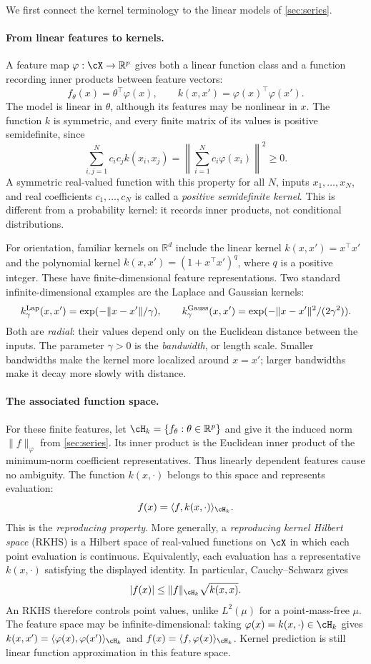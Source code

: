 \documentclass[11pt,twoside]{article}
\newcommand{\R}{\mathbb R}
\theoremstyle{definition}
\theoremstyle{remark}
\begin{document}
We first connect the kernel terminology to the linear models of
\cref{sec:series}.

\paragraph{From linear features to kernels.}
A feature map $\varphi:\cX\to\R^p$ gives both a linear function class and
a function recording inner products between feature vectors:
\[
 f_\theta(x)=\theta^\top\varphi(x),\qquad
 k(x,x')=\varphi(x)^\top\varphi(x').
\]
The model is linear in $\theta$, although its features may be nonlinear in
$x$. The function $k$ is symmetric, and every finite matrix of its values is
positive semidefinite, since
\[
 \sum_{i,j=1}^N c_ic_jk(x_i,x_j)
 =\left\|\sum_{i=1}^N c_i\varphi(x_i)\right\|^2\ge0.
\]
A symmetric real-valued function with this property for all $N$, inputs
$x_1,\ldots,x_N$, and real coefficients $c_1,\ldots,c_N$ is called a
\emph{positive semidefinite kernel}. This is different from a probability
kernel: it records inner products, not conditional distributions.

For orientation, familiar kernels on $\R^d$ include the linear kernel
$k(x,x')=x^\top x'$ and the polynomial kernel
$k(x,x')=(1+x^\top x')^q$, where $q$ is a positive integer. These have
finite-dimensional feature representations. Two standard
infinite-dimensional examples are the Laplace and Gaussian kernels:
\[
 k^{\rm Lap}_\gamma(x,x')=\exp(-\|x-x'\|/\gamma),\qquad
 k^{\rm Gauss}_\gamma(x,x')=\exp(-\|x-x'\|^2/(2\gamma^2)).
\]
Both are \emph{radial}: their values depend only on the Euclidean distance
between the inputs. The parameter $\gamma>0$ is the \emph{bandwidth}, or
length scale. Smaller bandwidths make the kernel more localized around
$x=x'$; larger bandwidths make it decay more slowly with distance.

\paragraph{The associated function space.}
For these finite features, let $\cH_k=\{f_\theta:\theta\in\R^p\}$ and give
it the induced norm $\|f\|_{\varphi}$ from \cref{sec:series}. Its inner
product is the Euclidean inner product of the minimum-norm coefficient
representatives. Thus linearly dependent features cause no ambiguity.
The function $k(x,\cdot)$ belongs to this space and represents evaluation:
\[
 f(x)=\langle f,k(x,\cdot)\rangle_{\cH_k}.
\]
This is the \emph{reproducing property}. More generally, a
\emph{reproducing kernel Hilbert space} (RKHS) is a Hilbert space of
real-valued functions on $\cX$ in which each point evaluation is continuous.
Equivalently, each evaluation has a representative $k(x,\cdot)$ satisfying
the displayed identity. In particular, Cauchy--Schwarz gives
\[
 |f(x)|\le\|f\|_{\cH_k}\sqrt{k(x,x)}.
\]
An RKHS therefore controls point values, unlike $L^2(\mu)$ for a
point-mass-free $\mu$. The feature space may be infinite-dimensional:
taking $\varphi(x)=k(x,\cdot)\in\cH_k$ gives
$k(x,x')=\langle\varphi(x),\varphi(x')\rangle_{\cH_k}$ and
$f(x)=\langle f,\varphi(x)\rangle_{\cH_k}$. Kernel prediction is still
linear function approximation in this feature space.
\end{document}

